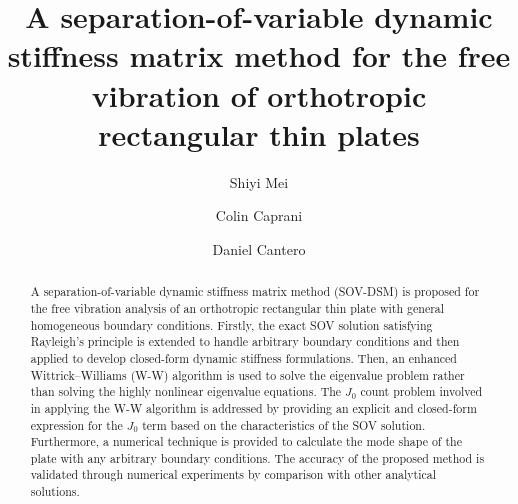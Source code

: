 \documentclass[preprint,12pt,number]{elsarticle}
\begin{document}
\onehalfspacing  %
\begin{frontmatter}
\title{A separation-of-variable dynamic stiffness matrix method for the free vibration of orthotropic rectangular thin plates}
\author[1]{Shiyi Mei}
\author[1]{Colin Caprani}
\author[2]{Daniel Cantero}
\begin{abstract}
	A separation-of-variable dynamic stiffness matrix method (SOV-DSM) is proposed for the free vibration analysis of an orthotropic rectangular thin plate with general homogeneous boundary conditions.  
	Firstly, the exact SOV solution satisfying Rayleigh’s principle is extended to handle arbitrary boundary conditions and then applied to develop closed-form dynamic stiffness formulations.
	Then, an enhanced Wittrick–Williams (W-W) algorithm is used to solve the eigenvalue problem rather than solving the highly nonlinear eigenvalue equations.
	The $J_0$ count problem involved in applying the W-W algorithm is addressed by providing an explicit and closed-form expression for the $J_0$ term based on the characteristics of the SOV solution.
	Furthermore, a numerical technique is provided to calculate the mode shape of the plate with any arbitrary boundary conditions.
	The accuracy of the proposed method is validated through numerical experiments by comparison with other analytical solutions.
\end{abstract}
\end{frontmatter}
\linenumbers
\end{document}
